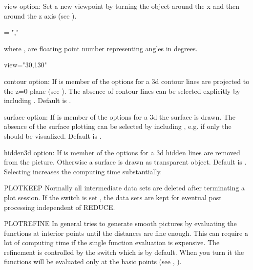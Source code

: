 \begin{Variable}{view}
 option:
Set a new viewpoint by turning the object around the x and then
around the z axis (see ).

\begin{Syntax}
 = ","
\end{Syntax}
where , are floating point number representing
angles in degrees.
\begin{Examples}
view="30,130"\\
\end{Examples}
\end{Variable}

\begin{Switch}{contour}
 option:
If  is member of the options for a 3d 
contour lines are projected to the z=0 plane
(see ). The absence of contour lines
can be selected explicitly by including . Default
is .
\end{Switch}


\begin{Switch}{surface}
 option:
If  is member of the options for a 3d 
the surface is drawn. The absence of the surface plotting
can be selected by including , e.g. if
only the  should be visualized. Default is .
\end{Switch}


\begin{Switch}{hidden3d}
 option:
If  is member of the options for a 3d 
hidden lines are removed from the picture. Otherwise a
surface is drawn as transparent object. Default is
. Selecting  increases the
computing time substantially.
\end{Switch}

\begin{Switch}{PLOTKEEP}
Normally all intermediate data sets are deleted after terminating
a plot session. If the switch  is set ,
the data sets are kept for eventual post processing independent
of REDUCE.
\end{Switch}

\begin{Switch}{PLOTREFINE}
In general  tries to generate smooth pictures by evaluating
the functions at interior points until the distances are fine
enough. This can require a lot of computing time if the
single function evaluation is expensive. The refinement is
controlled by the switch  which is 
by default. When you turn it  the functions will
be evaluated only at the basic points (see ,
).
\end{Switch}


